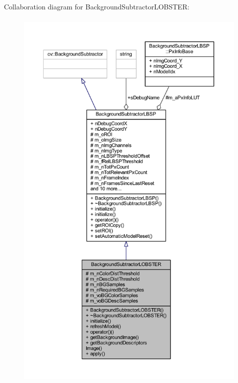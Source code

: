 Collaboration diagram for Background\+Subtractor\+L\+O\+B\+S\+T\+ER\+:\nopagebreak
\begin{figure}[H]
\begin{center}
\leavevmode
\includegraphics[height=550pt]{class_background_subtractor_l_o_b_s_t_e_r__coll__graph}
\end{center}
\end{figure}
